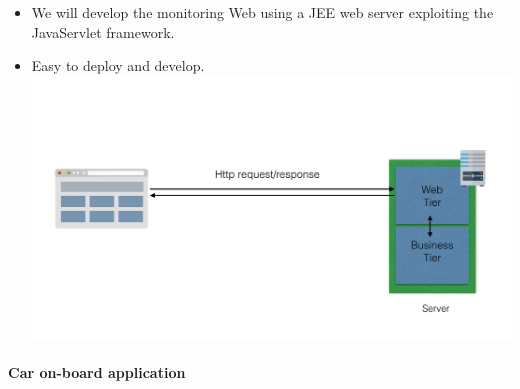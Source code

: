 \documentclass[]{article}
\let\oldparagraph\paragraph
\renewcommand{\paragraph}[1]{\oldparagraph{#1}\mbox{}}
\begin{document}
\begin{itemize}
\item
  We will develop the monitoring Web using a JEE web server exploiting
  the JavaServlet framework.
\item
  Easy to deploy and develop.\newline
  \includegraphics[width=1.00000\textwidth,height=1.00000\textwidth]{./images/webAppArch.png}
\end{itemize}

\paragraph{Car on-board application}\label{car-on-board-application}
\end{document}
